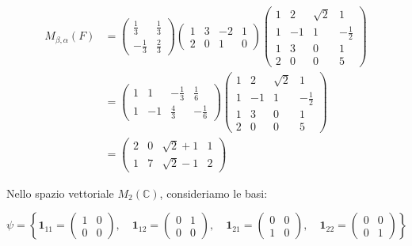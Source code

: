 \documentclass{article}
\theoremstyle{plain}
\theoremstyle{definition}
\theoremstyle{remark}
\begin{document}
\begin{align*}
M_{\beta,\alpha}(F) &= 
\begin{pmatrix} 
\frac{1}{3} & \frac{1}{3} \\ 
-\frac{1}{3} & \frac{2}{3} 
\end{pmatrix} 
\begin{pmatrix} 
1 & 3 & -2 & 1 \\ 
2 & 0 & 1 & 0 
\end{pmatrix} 
\begin{pmatrix}
1 & 2 & \sqrt{2} & 1 \\
1 & -1 & 1 & -\frac{1}{2} \\
1 & 3 & 0 & 1 \\
2 & 0 & 0 & 5
\end{pmatrix}    \\
&= 
\begin{pmatrix} 
1 & 1 & -\frac{1}{3} & \frac{1}{6} \\ 
1 & -1 & \frac{4}{3} & -\frac{1}{6} 
\end{pmatrix} 
\begin{pmatrix}
1 & 2 & \sqrt{2} & 1 \\
1 & -1 & 1 & -\frac{1}{2} \\
1 & 3 & 0 & 1 \\
2 & 0 & 0 & 5
\end{pmatrix}\\
&= 
\begin{pmatrix} 
2 & 0 & \sqrt{2}+1 & 1 \\ 
1 & 7 & \sqrt{2}-1 & 2 
\end{pmatrix}
\end{align*}

\vspace{10pt}

Nello spazio vettoriale \( M_2(\mathbb{C}) \), consideriamo le basi:

\[
\psi = \left\{ 
\mathbf{1}_{11} = \begin{pmatrix} 1 & 0 \\ 0 & 0 \end{pmatrix}, \quad 
\mathbf{1}_{12} = \begin{pmatrix} 0 & 1 \\ 0 & 0 \end{pmatrix}, \quad 
\mathbf{1}_{21} = \begin{pmatrix} 0 & 0 \\ 1 & 0 \end{pmatrix}, \quad 
\mathbf{1}_{22} = \begin{pmatrix} 0 & 0 \\ 0 & 1 \end{pmatrix} 
\right\}
\]
\end{document}
